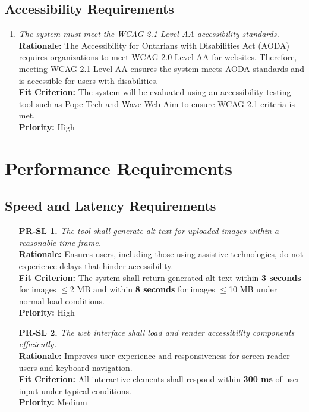 \documentclass[12pt]{article}
\begin{document}
\subsection{Accessibility Requirements}
\begin{enumerate}[label=UHR-AR \arabic*., wide=0pt, leftmargin=*]
\item \emph{The system must meet the WCAG 2.1 Level AA accessibility standards.}\\[2mm] 
    {\bf Rationale:} The Accessibility for Ontarians with Disabilities Act (AODA) requires organizations to meet WCAG 2.0 Level AA for websites. Therefore, meeting WCAG 2.1 Level AA ensures the system meets AODA standards and is accessible for users with disabilities.  \\
    {\bf Fit Criterion:} The system will be evaluated using an accessibility testing tool such as Pope Tech and Wave Web Aim to ensure WCAG 2.1 criteria is met.\\
    {\bf Priority:} High
\end{enumerate}


\section{Performance Requirements}

\subsection{Speed and Latency Requirements}
\begin{itemize}
    \item[\textbf{PR-SL 1.}] \textit{The tool shall generate alt-text for uploaded images within a reasonable time frame.}\\
    \textbf{Rationale:} Ensures users, including those using assistive technologies, do not experience delays that hinder accessibility.\\
    \textbf{Fit Criterion:} The system shall return generated alt-text within \textbf{3 seconds} for images $\leq$2 MB and within \textbf{8 seconds} for images $\leq$10 MB under normal load conditions.\\
    \textbf{Priority:} High

    \item[\textbf{PR-SL 2.}] \textit{The web interface shall load and render accessibility components efficiently.}\\
    \textbf{Rationale:} Improves user experience and responsiveness for screen-reader users and keyboard navigation.\\
    \textbf{Fit Criterion:} All interactive elements shall respond within \textbf{300 ms} of user input under typical conditions.\\
    \textbf{Priority:} Medium
\end{itemize}
\end{document}
